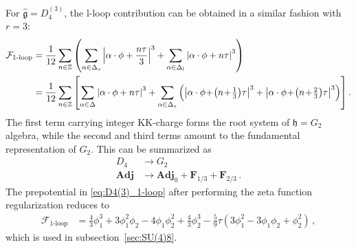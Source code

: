For $\hat{\mathfrak{g}} = D_4^{(3)}$, the l-loop contribution can be obtained in a similar fashion with $r=3$:
\begin{align}\label{eq:D4(3)_1-loop}
\mathcal{F}_{\text{1-loop}}
&= \frac{1}{12} \sum_{n \in \mathbb{Z}} \qty(\sum_{\alpha \in \Delta_s} \abs{\alpha\cdot \phi + \frac{n\tau}{3}}^3 + \sum_{\alpha \in \Delta_l} \abs{\alpha\cdot \phi + n\tau}^3 ) \\
& =\frac{1}{12} \sum_{n \in \mathbb{Z}} \qty[\sum_{\alpha \in \Delta} \abs{\alpha\cdot \phi + n \tau}^3 + \sum_{\alpha \in \Delta_s} \qty( \abs{\alpha\cdot \phi \!+\! \qty(n \!+\! \tfrac{1}{3})\tau}^3 + \abs{\alpha\cdot \phi \!+\! \qty(n \!+\! \tfrac{2}{3})\tau}^3 ) ] \, . \nonumber
\end{align}
The first term carrying integer KK-charge forms the root system of $ \mathfrak{h} = G_2 $ algebra, while the second and third terms amount to the fundamental representation of $ G_2 $. This can be summarized as
\begin{align}
D_4 &\to G_2 \nonumber \\
\mathbf{Adj} &\to \mathbf{Adj}_0 + \mathbf{F}_{1/3} + \mathbf{F}_{2/3} \, .
\end{align}
The prepotential in \eqref{eq:D4(3)_1-loop} after performing the zeta function regularization reduces to
\begin{align}
\mathcal{F}_{\text{1-loop}} &= \frac{4}{3}\phi_1^3 + 3\phi_1^2 \phi_2 - 4\phi_1 \phi_2^2 + \frac{4}{3}\phi_2^3 - \frac{5}{9}\tau (3\phi_1^2 - 3\phi_1 \phi_2 + \phi_2^2) \, ,
\end{align}
which is used in subsection~\ref{sec:SU(4)8}.


